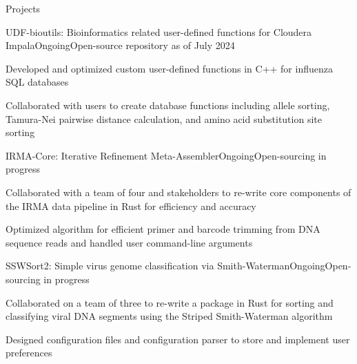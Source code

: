 \documentclass{resume} %
\begin{document}
\begin{rSection}{Projects} \itemsep -2pt



\begin{rSubsection}{UDF-bioutils: Bioinformatics related user-defined functions for Cloudera Impala}{Ongoing}{Open-source repository as of July 2024}{}
\item Developed and optimized custom user-defined functions in C++ for influenza SQL databases
\item Collaborated with users to create database functions including allele sorting, Tamura-Nei pairwise distance calculation, and amino acid substitution site sorting
\end{rSubsection}

\begin{rSubsection}{IRMA-Core: Iterative Refinement Meta-Assembler}{Ongoing}{Open-sourcing in progress}{}
\item Collaborated with a team of four and stakeholders to re-write core components of the IRMA data pipeline in Rust for efficiency and accuracy
\item Optimized algorithm for efficient primer and barcode trimming from DNA sequence reads and handled user command-line arguments
\end{rSubsection}

\pagebreak

\begin{rSubsection}{SSWSort2: Simple virus genome classification via Smith-Waterman}{Ongoing}{Open-sourcing in progress}{}
\item Collaborated on a team of three to re-write a package in Rust for sorting and classifying viral DNA segments using the Striped Smith-Waterman algorithm
\item Designed configuration files and configuration parser to store and implement user preferences
\end{rSubsection}


\end{rSection}
\end{document}
